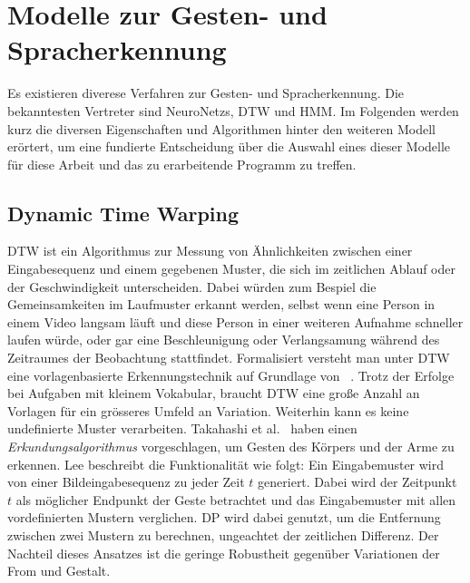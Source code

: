 \chapter{Modelle zur Gesten- und Spracherkennung}
\label{chap:Modelle}
Es existieren diverese Verfahren zur Gesten- und Spracherkennung. Die bekanntesten Vertreter sind \glspl{NeuroNetz}, \gls{DTW} und \gls{HMM}.
\newline
Im Folgenden werden kurz die diversen Eigenschaften und Algorithmen hinter den weiteren Modell er\"ortert, um eine fundierte Entscheidung \"uber die Auswahl eines dieser Modelle f\"ur diese Arbeit und das zu erarbeitende Programm zu treffen.

\section{Dynamic Time Warping}
\gls{DTW} ist ein Algorithmus zur Messung von \"Ahnlichkeiten zwischen einer Eingabesequenz und einem gegebenen Muster, die sich im zeitlichen Ablauf oder der Geschwindigkeit unterscheiden. Dabei w\"urden zum Bespiel die Gemeinsamkeiten im Laufmuster erkannt werden, selbst wenn eine Person in einem Video langsam l\"auft und diese Person in einer weiteren Aufnahme schneller laufen w\"urde, oder gar eine Beschleunigung oder Verlangsamung w\"ahrend des Zeitraumes der Beobachtung stattfindet.
\newline
Formalisiert versteht man unter \acrshort{DTW} eine vorlagenbasierte Erkennungstechnik auf Grundlage von ~\cite[S.~963]{bib:hmmlee}.
Trotz der Erfolge bei Aufgaben mit kleinem Vokabular, braucht \acrshort{DTW} eine gro\ss e Anzahl an Vorlagen f\"ur ein gr\"osseres Umfeld an Variation. Weiterhin kann es keine undefinierte Muster verarbeiten.
\newline
Takahashi et al.~\cite{bib:takahashi} haben einen \textit{Erkundungsalgorithmus} vorgeschlagen, um Gesten des K\"orpers und der Arme zu erkennen. Lee beschreibt die Funktionalit\"at wie folgt: Ein Eingabemuster wird von einer Bildeingabesequenz zu jeder Zeit $t$ generiert. Dabei wird der Zeitpunkt $t$ als m\"oglicher Endpunkt der Geste betrachtet und das Eingabemuster mit allen vordefinierten Mustern verglichen. \gls{DP} wird dabei genutzt, um die Entfernung zwischen zwei Mustern zu berechnen, ungeachtet der zeitlichen Differenz.
\newline
Der Nachteil dieses Ansatzes ist die geringe Robustheit gegen\"uber Variationen der From und Gestalt.

